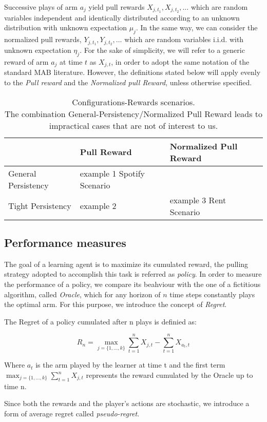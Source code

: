 Successive plays of arm $a_j$ yield pull rewards $X_{j,t_1}, X_{j,t_2},\dots$ which are random variables independent and identically distributed according to an unknown distribution with unknown expectation $\mu_j$.
In the same way, we can consider the normalized pull rewards, $Y_{j,t_1}, Y_{j,t_2}, \dots$ which are random variables i.i.d. with unknown expectation $\eta_j$. For the sake of simplicity, we will refer to a generic reward of arm $a_j$ at time $t$ as  $X_{j,t}$, in order to adopt the same notation of the standard MAB literature. However, the definitions stated below will apply evenly to the \emph{Pull reward} and the \emph{Normalized pull Reward}, unless otherwise specified.\\

\begin{table}

\begin{center}
	\caption{Configurations-Rewards scenarios. \\The combination General-Persistency/Normalized Pull Reward leads to impractical cases that are not of interest to us.}\label{tabNF}
	\begin{tabularx}{0.8\textwidth} { 
			| >{\raggedright\arraybackslash}X 
			| >{\centering\arraybackslash}X 
			| >{\centering\arraybackslash}X | }
		\hline
		  & Pull Reward & Normalized Pull Reward \\
		\hline
		General Persistency  & example 1 Spotify Scenario  &   \\
		\hline
		Tight Persistency  & example 2  & 
			example 3    Rent Scenario 
			 \\
		\hline		
	\end{tabularx}	
\end{center}

\end{table}




\subsection{ Performance measures}
The goal of a learning agent is to maximize its cumulated reward, the pulling strategy adopted to accomplish this task is referred as \emph{policy}. In order to measure the performance of a policy, we compare its beahviour with the one of a fictitious algorithm, called \emph{Oracle}, which for any horizon of $n$ time steps constantly plays the optimal arm. For this purpose, we introduce the concept of \emph{Regret}.
\begin{definition}[Regret]
	The Regret of a policy cumulated after n plays is definied as:
	
		$$R_n=\max_{j = \{1,\dots,k\}} \sum_{t=1}^n{X_{j,t}} - \sum_{t=1}^{n} X_{a_t,t} $$

	Where  $a_t$ is the arm played by the learner at time t and the first term $\max_{j = \{1,\dots,k\}}\sum_{t=1}^n{X_{j,t}}$ represents the reward cumulated by the Oracle up to time n.

\end{definition}
Since both the rewards and the player's actions are stochastic, we introduce a form of average regret called \emph{pseudo-regret}.

